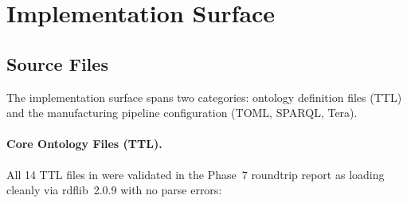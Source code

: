 
\section{Implementation Surface}
\label{sec:research-open-ontologies-implementation}

\subsection{Source Files}
\label{sec:research-open-ontologies-source-files}

The implementation surface spans two categories: ontology definition files (TTL) and the
manufacturing pipeline configuration (TOML, SPARQL, Tera).

\paragraph{Core Ontology Files (TTL).}
All 14 TTL files in  were validated in the Phase~7
roundtrip report as loading cleanly via rdflib~2.0.9 with no parse errors:

